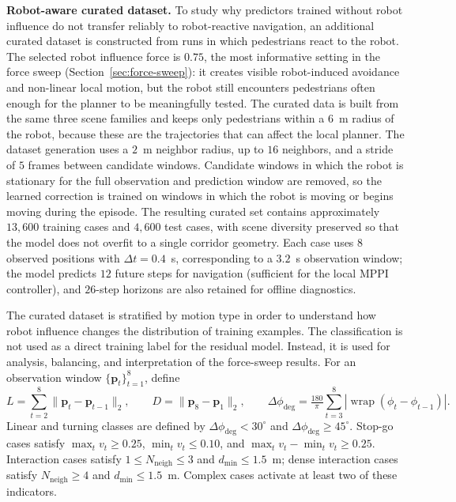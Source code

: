 \documentclass[12pt, a4paper]{article}
\begin{document}
\textbf{Robot-aware curated dataset.} To study why predictors trained without robot influence do not transfer reliably to robot-reactive navigation, an additional curated dataset is constructed from runs in which pedestrians react to the robot. The selected robot influence force is $0.75$, the most informative setting in the force sweep (Section~\ref{sec:force-sweep}): it creates visible robot-induced avoidance and non-linear local motion, but the robot still encounters pedestrians often enough for the planner to be meaningfully tested. The curated data is built from the same three scene families and keeps only pedestrians within a $6$~m radius of the robot, because these are the trajectories that can affect the local planner. The dataset generation uses a $2$~m neighbor radius, up to $16$ neighbors, and a stride of $5$ frames between candidate windows. Candidate windows in which the robot is stationary for the full observation and prediction window are removed, so the learned correction is trained on windows in which the robot is moving or begins moving during the episode. The resulting curated set contains approximately $13{,}600$ training cases and $4{,}600$ test cases, with scene diversity preserved so that the model does not overfit to a single corridor geometry. Each case uses $8$ observed positions with $\Delta t=0.4$~s, corresponding to a $3.2$~s observation window; the model predicts $12$ future steps for navigation (sufficient for the local MPPI controller), and $26$-step horizons are also retained for offline diagnostics.

The curated dataset is stratified by motion type in order to understand how robot influence changes the distribution of training examples. The classification is not used as a direct training label for the residual model. Instead, it is used for analysis, balancing, and interpretation of the force-sweep results. For an observation window $\{\mathbf{p}_t\}_{t=1}^{8}$, define
\[
L=\sum_{t=2}^{8}\|\mathbf{p}_{t}-\mathbf{p}_{t-1}\|_2,
\qquad
D=\|\mathbf{p}_{8}-\mathbf{p}_{1}\|_2,
\qquad
\Delta\phi_{\deg}=\tfrac{180}{\pi}\sum_{t=3}^{8}|\operatorname{wrap}(\phi_t-\phi_{t-1})|.
\]
Linear and turning classes are defined by $\Delta\phi_{\deg}<30^\circ$ and $\Delta\phi_{\deg}\ge 45^\circ$. Stop-go cases satisfy $\max_t v_t\ge 0.25$, $\min_t v_t\le 0.10$, and $\max_t v_t-\min_t v_t\ge 0.25$. Interaction cases satisfy $1\le N_{\text{neigh}}\le 3$ and $d_{\min}\le 1.5$~m; dense interaction cases satisfy $N_{\text{neigh}}\ge 4$ and $d_{\min}\le 1.5$~m. Complex cases activate at least two of these indicators.
\end{document}
